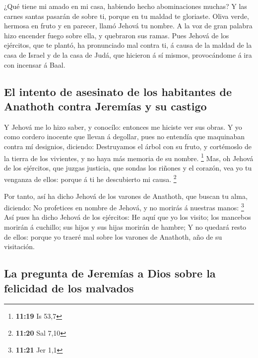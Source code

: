  ¿Qué tiene mi amado en mi casa, habiendo hecho
abominaciones muchas? Y las carnes santas pasarán de sobre ti, porque en
tu maldad te gloriaste.  Oliva verde, hermosa en fruto y en
parecer, llamó Jehová tu nombre. A la voz de gran palabra hizo encender
fuego sobre ella, y quebraron sus ramas.  Pues Jehová de
los ejércitos, que te plantó, ha pronunciado mal contra ti, á causa de
la maldad de la casa de Israel y de la casa de Judá, que hicieron á sí
mismos, provocándome á ira con incensar á Baal.

\hypertarget{el-intento-de-asesinato-de-los-habitantes-de-anathoth-contra-jeremuxedas-y-su-castigo}{%
\subsection{El intento de asesinato de los habitantes de Anathoth contra
Jeremías y su
castigo}\label{el-intento-de-asesinato-de-los-habitantes-de-anathoth-contra-jeremuxedas-y-su-castigo}}

 Y Jehová me lo hizo saber, y conocílo: entonces me hiciste
ver sus obras.  Y yo como cordero inocente que llevan á
degollar, pues no entendía que maquinaban contra mí designios, diciendo:
Destruyamos el árbol con su fruto, y cortémoslo de la tierra de los
vivientes, y no haya más memoria de su nombre. \footnote{\textbf{11:19}
  Is 53,7}  Mas, oh Jehová de los ejércitos, que juzgas
justicia, que sondas los riñones y el corazón, vea yo tu venganza de
ellos: porque á ti he descubierto mi causa. \footnote{\textbf{11:20} Sal
  7,10}

 Por tanto, así ha dicho Jehová de los varones de Anathoth,
que buscan tu alma, diciendo: No profetices en nombre de Jehová, y no
morirás á nuestras manos: \footnote{\textbf{11:21} Jer 1,1}
 Así pues ha dicho Jehová de los ejércitos: He aquí que yo
los visito; los mancebos morirán á cuchillo; sus hijos y sus hijas
morirán de hambre;  Y no quedará resto de ellos: porque yo
traeré mal sobre los varones de Anathoth, año de su visitación.

\hypertarget{la-pregunta-de-jeremuxedas-a-dios-sobre-la-felicidad-de-los-malvados}{%
\subsection{La pregunta de Jeremías a Dios sobre la felicidad de los
malvados}\label{la-pregunta-de-jeremuxedas-a-dios-sobre-la-felicidad-de-los-malvados}}

